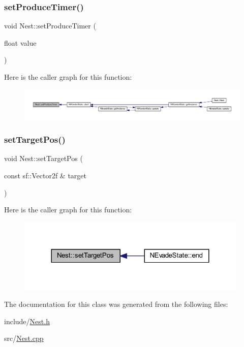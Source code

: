 \subsubsection{\texorpdfstring{set\+Produce\+Timer()}{setProduceTimer()}}
{\footnotesize\ttfamily void Nest\+::set\+Produce\+Timer (\begin{DoxyParamCaption}\item[{float}]{value }\end{DoxyParamCaption})}

Here is the caller graph for this function\+:
\nopagebreak
\begin{figure}[H]
\begin{center}
\leavevmode
\includegraphics[width=350pt]{class_nest_a8788296c980a2aa1d4f7cac073650496_icgraph}
\end{center}
\end{figure}
\mbox{\label{class_nest_ac9f5891628b3474d60887521ff54d668}} 
\subsubsection{\texorpdfstring{set\+Target\+Pos()}{setTargetPos()}}
{\footnotesize\ttfamily void Nest\+::set\+Target\+Pos (\begin{DoxyParamCaption}\item[{const sf\+::\+Vector2f \&}]{target }\end{DoxyParamCaption})}

Here is the caller graph for this function\+:
\nopagebreak
\begin{figure}[H]
\begin{center}
\leavevmode
\includegraphics[width=312pt]{class_nest_ac9f5891628b3474d60887521ff54d668_icgraph}
\end{center}
\end{figure}


The documentation for this class was generated from the following files\+:\begin{DoxyCompactItemize}
\item 
include/\hyperlink{_nest_8h}{Nest.\+h}\item 
src/\hyperlink{_nest_8cpp}{Nest.\+cpp}\end{DoxyCompactItemize}
